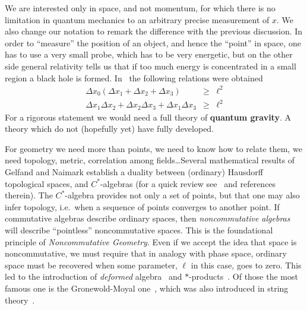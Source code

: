 \documentclass[12pt,a4paper]{article}
\newcommand{\bea}{\begin{eqnarray}}
\newcommand{\eea}{\end{eqnarray}}
\begin{document}
We are interested only in space, and not momentum, for which there is no limitation in quantum mechanics to an arbitrary precise measurement of $x$. We also change our notation to remark the difference with the previous discussion.
 In order to ``measure'' the position of an object, and hence the
``point'' in space, one has to use a very small probe, which has to be very energetic, but on the other
side general relativity tells us that if too much energy is
concentrated in a small region a black hole is formed. In~\cite{DFR} the following relations were obtained
\bea
\Delta x_0(\Delta x_1+\Delta x_2+\Delta x_3)&\geq&\ell^2 \nonumber\\
\Delta x_1\Delta x_2+\Delta x_2\Delta x_3+\Delta x_1\Delta x_3&\geq&\ell^2
\eea
For a rigorous statement we would need a full theory of {\bf quantum gravity}. A theory which do not (hopefully yet) have fully developed.

For geometry we need more than points, we need to know how to relate them, we need topology, metric, correlation among fields\ldots  Several mathematical results of Gelfand and Naimark establish a duality between (ordinary) Hausdorff topological spaces, and $C^*$-algebras (for a quick review see~\cite[Chapt.~6]{WSS} and references therein). The $C^*$-algebra provides not only a set of points, but  that one may also infer topology, i.e.\ when a sequence of points converges to another point. If commutative algebras describe ordinary spaces, then \emph{noncommutative algebras} will describe ``pointless'' noncommutative spaces. This is the foundational principle of \emph{Noncommutative Geometry}. Even if we accept the idea that space is noncommutative, we must require that in analogy with phase space, ordinary space must be recovered when some parameter, $\ell$ in this case, goes to zero. This led to the introduction of \emph{deformed} algebra~\cite{Gerstenhaber} and $*$-products~\cite{starprod}. Of those the most famous one is the Gronewold-Moyal one~\cite{Gronewold,Moyal}, which was also introduced in string theory~\cite{FrohlichGawedski, LLS1, SeibergWitten}. 
\end{document}
